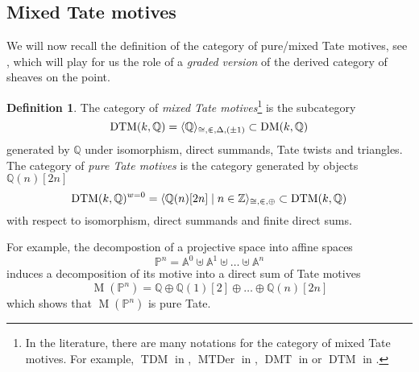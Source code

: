 \documentclass{amsart}
\theoremstyle{plain}
\theoremstyle{TheoremNum}
\theoremstyle{definition}
\newtheorem{definition}[theorem]{Definition}
\theoremstyle{remark}
\numberwithin{equation}{section}
\newcommand{\A}{\mathbb{A}}
\newcommand{\Q}{\mathbb{Q}}
\newcommand{\Z}{\mathbb{Z}}
\newcommand{\un}{\Q}
\newcommand{\Mot}{\operatorname{M}}
\newcommand{\DM}{\operatorname{DM}}
\newcommand{\DTM}{\operatorname{DTM}}
\begin{document}
\subsection{Mixed Tate motives} \label{sec:tatemotives}
We will now recall the definition of the category of pure/mixed Tate motives, see \cite{levine_mixed_2005}, which will play for us the role of a \emph{graded version} of the derived category of sheaves on the point.
\begin{definition}
The category of \emph{mixed Tate motives}\footnote{In the literature, there are many notations for the category of mixed Tate motives. For example, $\operatorname{TDM}$ in \cite{huber_slice_2006}, $\operatorname{MTDer}$  in \cite{soergel_perverse_2018,soergel_equivariant_2018}, $\operatorname{DMT}$ in \cite{spitzweck_notes_2016} or $\operatorname{DTM}$ in \cite{levine_mixed_2005}.} is the subcategory
$$\DTM(k,\Q)=\langle\un\rangle_{\cong, \inplus, \Delta, (\pm 1)}\subset\DM(k,\Q)$$
generated by $\un$ under isomorphism, direct summands, Tate twists and triangles. The category of \emph{pure Tate motives} is the category generated by objects $\Q(n)[2n]$
$$\DTM(k,\Q)^{w=0}=\langle \Q(n)[2n]\mid n\in \Z \rangle_{\cong,\inplus,\oplus}\subset \DTM(k,\Q)$$
with respect to isomorphism, direct summands and finite direct sums.
\end{definition}

For example, the decompostion of a projective space into affine spaces
$$\mathbb{P}^n=\A^0\uplus \A^1 \uplus\dots \uplus \A^n$$
induces a decomposition of its motive into a direct sum of Tate motives
$$\Mot(\mathbb{P}^n)=\Q\oplus \Q(1)[2]\oplus\dots\oplus \Q(n)[2n]$$
which shows that $\Mot(\mathbb{P}^n)$ is pure Tate.
\end{document}

